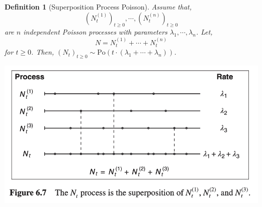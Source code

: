 \documentclass{tufte-handout}
\newtheorem{defn}[thm]{Definition}
\begin{document}
\begin{defn}[Superposition Process Poisson]
  Assume that,
  \[\left(N_{t}^{(1)}\right)_{t \geq 0}, \cdots,\left(N_{t}^{(n)}\right)_{t \geq 0}\]
  \noindent are $n$ independent Poisson processes with parameters $\lambda_1, \cdots, \lambda_n$. Let,
  \[N = N_t^{(1)} + \cdots + N_t^{(n)}\]
  \noindent for $t \geq 0$. Then, $(N_t)_{t \geq 0} \sim \text{Po}(t \cdot (\lambda_1 + \cdots + \lambda_n))$.
\end{defn}

\begin{marginfigure}
  \begin{center}
    \includegraphics[width=\textwidth]{fig-20.png}
  \end{center}
\end{marginfigure}
\end{document}
